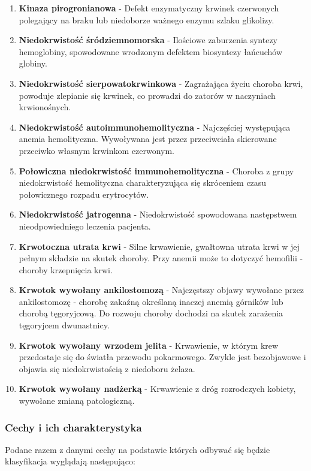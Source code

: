 \documentclass[runningheads]{llncs}
\begin{document}
\begin{enumerate}
    \item \textbf{Kinaza pirogronianowa} -
    Defekt enzymatyczny krwinek czerwonych polegający na braku lub niedoborze ważnego enzymu szlaku glikolizy.
    \item \textbf{Niedokrwistość śródziemnomorska} -
Ilościowe zaburzenia syntezy hemoglobiny, spowodowane wrodzonym defektem biosyntezy łańcuchów globiny.
    \item \textbf{Niedokrwistość sierpowatokrwinkowa} -
Zagrażająca życiu choroba krwi, powoduje zlepianie się krwinek, co
prowadzi do zatorów w naczyniach krwionośnych.
    \item \textbf{Niedokrwistość autoimmunohemolityczna} -
Najczęściej występująca anemia hemolityczna. Wywoływana jest przez
przeciwciała skierowane przeciwko własnym krwinkom czerwonym.
\item \textbf{Połowiczna niedokrwistość immunohemolityczna} -
Choroba z grupy niedokrwistość hemolityczna charakteryzująca się
skróceniem czasu połowicznego rozpadu erytrocytów.
\item \textbf{Niedokrwistość jatrogenna} -
Niedokrwistość spowodowana następstwem nieodpowiedniego leczenia
pacjenta.
\item \textbf{Krwotoczna utrata krwi} -
Silne krwawienie, gwałtowna utrata krwi w jej pełnym składzie na skutek
choroby. Przy anemii może to dotyczyć hemofilii - choroby krzepnięcia
krwi.
\item \textbf{Krwotok wywołany ankilostomozą} -
Najczęstszy objawy wywołane przez ankilostomozę - chorobę zakaźną
określaną inaczej anemią górników lub chorobą tęgoryjcową. Do rozwoju
choroby dochodzi na skutek zarażenia tęgoryjcem dwunastnicy.
\item \textbf{Krwotok wywołany wrzodem jelita} -
Krwawienie, w którym krew przedostaje się do światła przewodu
pokarmowego. Zwykle jest bezobjawowe i objawia się niedokrwistością z
niedoboru żelaza.
\item \textbf{Krwotok wywołany nadżerką} -
Krwawienie z dróg rozrodczych kobiety, wywołane zmianą patologiczną.
\end{enumerate}

\subsubsection{Cechy i ich charakterystyka}
Podane razem z danymi cechy na podstawie których odbywać się będzie klasyfikacja wyglądają następująco:


    
\end{document}
